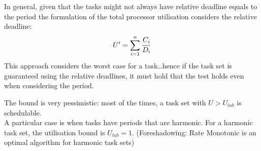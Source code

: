 In general, given that the tasks might not always have relative deadline equals to the period the formulation of the total processor utilisation considers the relative deadline:
\[U' = \sum_{i=1}^n \cfrac{C_i}{D_i}\]
This approach considers the worst case for a task\dots hence if the task set is guaranteed using the relative deadlines, it must hold that the test holds even when considering the period.

The bound is very pessimistic: most of the times, a task set with $U>U_{lub}$ is schedulable.\\
A particular case is when tasks have periods that are harmonic.
For a harmonic task set, the utilisation bound is $U_{lub} = 1$.
(Foreshadowing: Rate Monotonic is an optimal algorithm for harmonic task sets)
